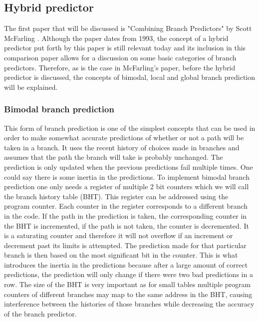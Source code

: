 \subsection{Hybrid predictor}
The first paper that will be discussed is "Combining Branch Predictors" by Scott McFarling \cite{hybrid}. Although the paper dates from 1993, the concept of a hybrid predictor put forth by this paper is still relevant today and its inclusion in this comparison paper allows for a discussion on some basic categories of branch predictors. Therefore, as is the case in McFarling's paper, before the hybrid predictor is discussed, the concepts of bimodal, local and global branch prediction will be explained.
\subsubsection{Bimodal branch prediction}
This form of branch prediction is one of the simplest concepts that can be used in order to make somewhat 
accurate predictions of whether or not a path will be taken in a branch. It uses the recent history of choices made in branches and assumes that the path the branch will take is probably unchanged. The prediction is only updated when the previous predictions fail multiple times. One could say there is some inertia in the predictions. To implement bimodal branch prediction one only needs a register of multiple 2 bit counters which we will call the branch history table (BHT). This register can be addressed using the program counter. Each counter in the register corresponds to a different branch in the code. If the path in the prediction is taken, the corresponding counter in the BHT is incremented, if the path is not taken, the counter is decremented. It is a saturating counter and therefore it will not overflow if an increment or decrement past its limits is attempted. The prediction made for that particular branch is then based on the most significant bit in the counter. This is what introduces the inertia in the predictions because after a large amount of correct predictions, the prediction will only change if there were two bad predictions in a row. The size of the BHT is very important as for small tables multiple program counters of different branches may map to the same address in the BHT, causing interference between the histories of those branches while decreasing the accuracy of the branch predictor.
